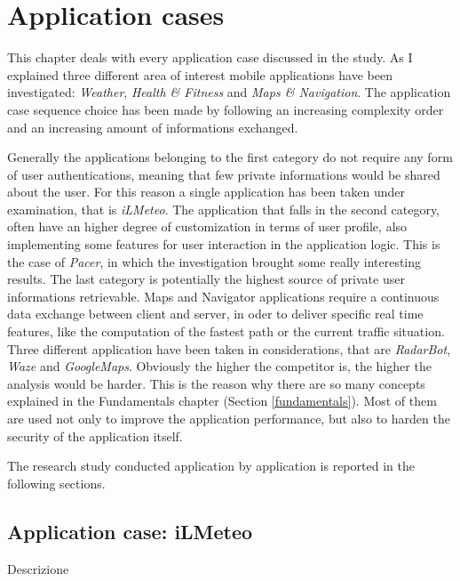 \chapter{Application cases}
\label{chap:use_cases}
	\par This chapter deals with every application case discussed in the study. As I explained three different area of interest mobile applications have been investigated: \textit{Weather}, \textit{Health \& Fitness} and \textit{Maps \& Navigation}. The application case sequence choice  has been made by following an increasing complexity order and an increasing amount of informations exchanged. \newline
	\par Generally the applications belonging to the first category do not require any form of user authentications, meaning that few private informations would be shared about the user. For this reason a single application has been taken under examination, that is \textit{iLMeteo}.\newline
	The application that falls in the second category, often have an higher degree of customization in terms of user profile, also implementing some features for user interaction in the application logic. This is the case of \textit{Pacer}, in which the investigation brought some really interesting results.\newline
	The last category is potentially the highest source of private user informations retrievable. Maps and Navigator applications require a continuous data exchange between client and server, in oder to deliver specific real time features, like the computation of the fastest path or the current traffic situation. Three different application have been taken in considerations, that are \textit{RadarBot}, \textit{Waze} and \textit{GoogleMaps}. \newline
	Obviously the higher the competitor is, the higher the analysis would be harder. This is the reason why there are so many concepts explained in the Fundamentals chapter (Section \ref{fundamentals}). Most of them are used not only to improve the application performance, but also to harden the security of the application itself. \newline
	\par The research study conducted application by application is reported in the following sections.
	
	\section{Application case: iLMeteo}
		\par Descrizione
